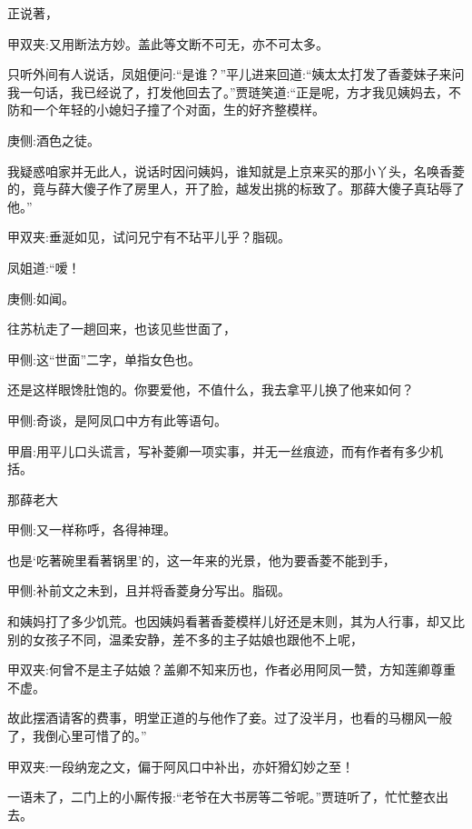 \begin{parag}
    正说著，\begin{note}甲双夹:又用断法方妙。盖此等文断不可无，亦不可太多。\end{note}只听外间有人说话，凤姐便问:“是谁？”平儿进来回道:“姨太太打发了香菱妹子来问我一句话，我已经说了，打发他回去了。”贾琏笑道:“正是呢，方才我见姨妈去，不防和一个年轻的小媳妇子撞了个对面，生的好齐整模样。\begin{note}庚侧:酒色之徒。\end{note}我疑惑咱家并无此人，说话时因问姨妈，谁知就是上京来买的那小丫头，名唤香菱的，竟与薛大傻子作了房里人，开了脸，越发出挑的标致了。那薛大傻子真玷辱了他。”\begin{note}甲双夹:垂涎如见，试问兄宁有不玷平儿乎？脂砚。\end{note}凤姐道:“嗳！\begin{note}庚侧:如闻。\end{note}往苏杭走了一趟回来，也该见些世面了，\begin{note}甲侧:这“世面”二字，单指女色也。\end{note}还是这样眼馋肚饱的。你要爱他，不值什么，我去拿平儿换了他来如何？\begin{note}甲侧:奇谈，是阿凤口中方有此等语句。\end{note}\begin{note}甲眉:用平儿口头谎言，写补菱卿一项实事，并无一丝痕迹，而有作者有多少机括。\end{note}那薛老大\begin{note}甲侧:又一样称呼，各得神理。\end{note}也是‘吃著碗里看著锅里’的，这一年来的光景，他为要香菱不能到手，\begin{note}甲侧:补前文之未到，且并将香菱身分写出。脂砚。\end{note}和姨妈打了多少饥荒。也因姨妈看著香菱模样儿好还是末则，其为人行事，却又比别的女孩子不同，温柔安静，差不多的主子姑娘也跟他不上呢，\begin{note}甲双夹:何曾不是主子姑娘？盖卿不知来历也，作者必用阿凤一赞，方知莲卿尊重不虚。\end{note}故此摆酒请客的费事，明堂正道的与他作了妾。过了没半月，也看的马棚风一般了，我倒心里可惜了的。”\begin{note}甲双夹:一段纳宠之文，偏于阿风口中补出，亦奸猾幻妙之至！\end{note}一语未了，二门上的小厮传报:“老爷在大书房等二爷呢。”贾琏听了，忙忙整衣出去。
\end{parag}


